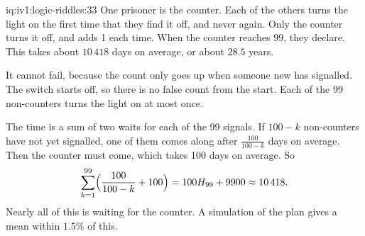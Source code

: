 \begin{solution}{iq:iv1:logic-riddles:33}
One prisoner is the counter. Each of the others turns the light on the first time that they find it off, and never again. Only the counter turns it off, and adds 1 each time. When the counter reaches 99, they declare. This takes about $10\,418$ days on average, or about $28.5$ years.

It cannot fail, because the count only goes up when someone new has signalled. The switch starts off, so there is no false count from the start. Each of the 99 non-counters turns the light on at most once.

The time is a sum of two waits for each of the 99 signals. If $100 - k$ non-counters have not yet signalled, one of them comes along after $\frac{100}{100 - k}$ days on average. Then the counter must come, which takes 100 days on average. So
\[
\sum_{k = 1}^{99} \Bigl(\frac{100}{100 - k} + 100\Bigr) = 100 H_{99} + 9900 \approx 10\,418.
\]
Nearly all of this is waiting for the counter. A simulation of the plan gives a mean within $1.5\%$ of this.

\end{solution}

